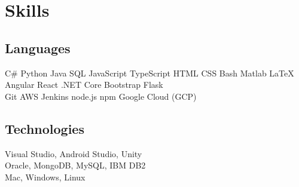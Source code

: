 \documentclass[]{deedy-resume}
\begin{document}
\section{Skills}
\begin{minipage}[t]{.6\textwidth}
\subsection{Languages}
C\# \textbullet{}  Python \textbullet{} Java \textbullet{} SQL \textbullet{} JavaScript \textbullet{} TypeScript \textbullet{} HTML \textbullet{} CSS \textbullet{} Bash \textbullet{} Matlab \textbullet{} \LaTeX\ \\ 
Angular \textbullet{} React \textbullet{} .NET Core \textbullet{} Bootstrap \textbullet{} Flask \\
Git \textbullet{} AWS \textbullet{} Jenkins \textbullet{}  node.js \textbullet{} npm \textbullet{} Google Cloud (GCP)
\sectionsep
\end{minipage}
\hfill
\begin{minipage}[t]{.35\textwidth}
\subsection{Technologies}
 Visual Studio, Android Studio, Unity \\
 Oracle, MongoDB, MySQL, IBM DB2\\
 Mac, Windows, Linux\\
\end{minipage}

\end{document}
